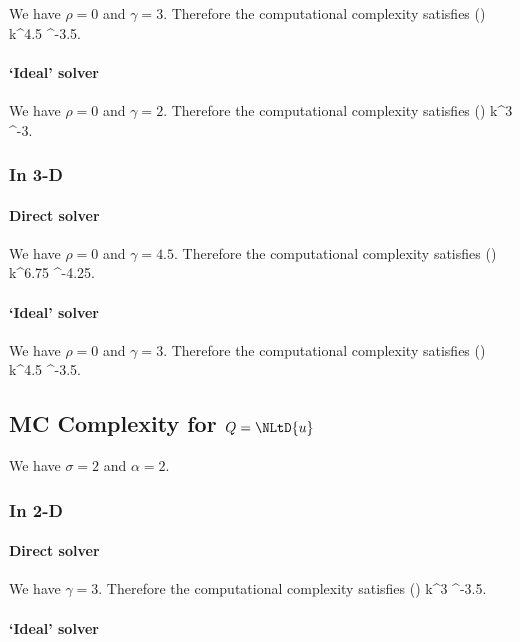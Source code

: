 We have $\rho=0$ and $\gamma = 3$. Therefore  the computational complexity satisfies
\beqs
\CMC(\eps) \lesssim k^{4.5} \eps^{-3.5}.
\eeqs

\paragraph{`Ideal' solver}

We have $\rho=0$ and  $\gamma = 2$. Therefore  the computational complexity satisfies
\beqs
\CMC(\eps) \lesssim k^3 \eps^{-3}.
\eeqs

\subsubsection{In 3-D}

\paragraph{Direct solver}

We have $\rho=0$ and $\gamma = 4.5$. Therefore  the computational complexity satisfies
\beqs
\CMC(\eps) \lesssim k^{6.75} \eps^{-4.25}.
\eeqs

\paragraph{`Ideal' solver}

We have $\rho=0$ and  $\gamma = 3$. Therefore  the computational complexity satisfies
\beqs
\CMC(\eps) \lesssim k^{4.5} \eps^{-3.5}.
\eeqs

\subsection{MC Complexity for $Q=\NLtD{u}$}

We have $\sigma = 2$ and $\alpha = 2.$

\subsubsection{In 2-D}

\paragraph{Direct solver}

We have $\gamma = 3$. Therefore  the computational complexity satisfies
\beqs
\CMC(\eps) \lesssim k^3 \eps^{-3.5}.
\eeqs

\paragraph{`Ideal' solver}

